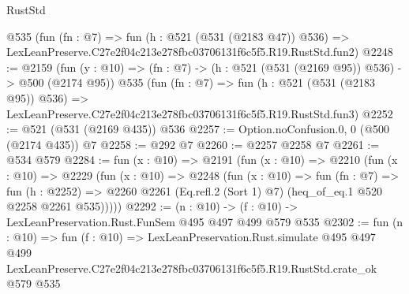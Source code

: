 \begin{lexlean}{RustStd}
\begin{coremodule}
    @535
    (fun (fn : @7) =>
    fun (h : @521 (@531 (@2183 @47)) @536) =>
    LexLeanPreserve.C27e2f04c213e278fbc03706131f6c5f5.R19.RustStd.fun2)
@2248 := @2159
    (fun (y : @10) => (fn : @7) -> (h : @521 (@531 (@2169 @95)) @536) -> @500 (@2174 @95))
    @535
    (fun (fn : @7) =>
    fun (h : @521 (@531 (@2183 @95)) @536) =>
    LexLeanPreserve.C27e2f04c213e278fbc03706131f6c5f5.R19.RustStd.fun3)
@2252 := @521 (@531 (@2169 @435)) @536
@2257 := Option.noConfusion.{0, 0} (@500 (@2174 @435)) @7
@2258 := @292 @7
@2260 := @2257 @2258 @7
@2261 := @534 @579
@2284 := fun (x : @10) =>
  @2191
    (fun (x : @10) =>
    @2210
      (fun (x : @10) =>
      @2229
        (fun (x : @10) =>
        @2248
          (fun (x : @10) =>
          fun (fn : @7) =>
          fun (h : @2252) =>
          @2260 @2261 (Eq.refl.{2} (Sort 1) @7) (heq_of_eq.{1} @520 @2258 @2261 @535)))))
@2292 := (n : @10) -> (f : @10) -> LexLeanPreservation.Rust.FunSem @495 @497 @499 @579 @535
@2302 := fun (n : @10) =>
  fun (f : @10) =>
  LexLeanPreservation.Rust.simulate
    @495
    @497
    @499
    LexLeanPreserve.C27e2f04c213e278fbc03706131f6c5f5.R19.RustStd.crate_ok
    @579
    @535
\end{coremodule}
\end{lexlean}
